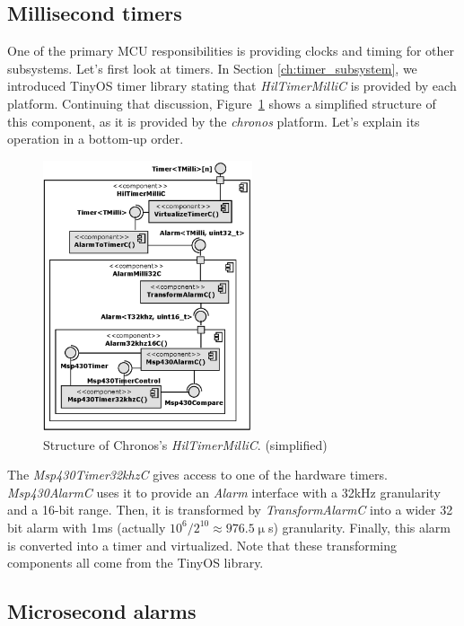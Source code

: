 \subsection{Millisecond timers}

One of the primary MCU responsibilities is providing clocks and timing for other subsystems. Let's first look at timers. In Section \ref{ch:timer_subsystem}, we introduced TinyOS timer library stating that \emph{HilTimerMilliC} is provided by each platform. Continuing that discussion, Figure~\ref{fig:hil_timer_milli_c} shows a simplified structure of this component, as it is provided by the \emph{chronos} platform.
Let's explain its operation in a bottom-up order.
\begin{figure}[h!]
  \centering
  \includegraphics[width=0.55\textwidth]{diagrams/hil_timer_milli_c.eps}
  \caption{Structure of Chronos's \emph{HilTimerMilliC}. (simplified)}
  \label{fig:hil_timer_milli_c}
\end{figure}

The \emph{Msp430Timer32khzC} gives access to one of the hardware timers. \emph{Msp430AlarmC} uses it to provide an \emph{Alarm} interface with a 32kHz granularity and a 16-bit range. Then, it is transformed by \emph{TransformAlarmC} into a wider 32 bit alarm with 1ms (actually $10^6 / 2^{10} \approx 976.5\upmu$s) granularity. Finally, this alarm is converted into a timer and virtualized. Note that these transforming components all come from the TinyOS library.

\subsection{Microsecond alarms}

